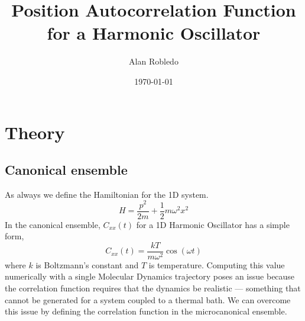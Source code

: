 \documentclass{article}
\title{Position Autocorrelation Function for a Harmonic Oscillator}
\date{\today}
\author{Alan Robledo}
\newcommand{\be}{\begin{equation}}
\newcommand{\ee}{\end{equation}}
\begin{document}
\maketitle
\section{Theory}
\subsection{Canonical ensemble}
As always we define the Hamiltonian for the 1D system.
\be
  H = \frac{p^2}{2m} + \frac{1}{2} m \omega^2 x^2
\ee
In the canonical ensemble, $C_{xx}(t)$ for a 1D Harmonic Oscillator has a simple form,
\be
  C_{xx}(t) = \frac{kT}{m \omega^2} \cos(\omega t)
\ee
where $k$ is Boltzmann's constant and $T$ is temperature. Computing this value numerically with a single Molecular Dynamics trajectory poses an issue because the correlation function requires that the dynamics be realistic --- something that cannot be generated for a system coupled to a thermal bath. We can overcome this issue by defining the correlation function in the microcanonical ensemble.
\end{document}
